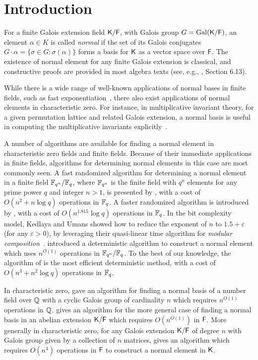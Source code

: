 \section{Introduction}

For a finite Galois extension field ${\mathsf{K}}/{\mathsf{F}}$, with Galois group $G =
\mathrm{Gal}({\mathsf{K}}/{\mathsf{F}})$, an element $\alpha \in K$ is called
\emph{normal} if the set of its Galois conjugates $G \cdot \alpha =
\{\sigma\in G: \sigma(\alpha)\}$ forms a basis for ${\mathsf{K}}$ as a vector space over
${\mathsf{F}}$. The existence of normal element for any finite Galois extension
is classical, and constructive proofs are provided in most algebra texts
(see, e.g., \cite{Lang}, Section 6.13).
 
While there is a wide range of well-known applications of normal bases in
finite fields, such as fast exponentiation~\cite{GaGaPaSh00}, there also
exist applications of normal elements in characteristic zero.  For instance,
in multiplicative invariant theory, for a given permutation lattice and
related Galois extension, a normal basis is useful in computing the
multiplicative invariants explicitly~\cite{Jam18}.

A number of algorithms are available for finding a normal element in
characteristic zero fields and finite fields.  Because of their immediate
applications in finite fields, algorithms for determining normal elements
in this case are most commonly seen.  A fast randomized algorithm for
determining a normal element in a finite field $\mathbb{F}_{q^n}/\mathbb{F}_q$, where
$\mathbb{F}_{q^n}$ is the finite field with $q^n$ elements for any prime power $q$
and integer $n>1$, is presented by , with a cost of
$O(n^2+n\log q)$ operations in $\mathbb{F}_q$.  A faster randomized algorithm is
introduced by , with a cost of $O(n^{1.815}\log q)$
operations in $\mathbb{F}_q$.  In the bit complexity model, Kedlaya and Umans showed
how to reduce the exponent of $n$ to $1.5+\varepsilon$ (for any
$\varepsilon > 0$), by leveraging their quasi-linear time algorithm for
{\em modular composition}~\cite{KeUm11}.  introduced a
deterministic algorithm to construct a normal element which uses $n^{O(1)}$
operations in $\mathbb{F}_{q^n}/\mathbb{F}_q$.  To the best of our knowledge, the
algorithm of  is the most efficient deterministic method,
with a cost of $O(n^3+n^2\log q)$ operations in $\mathbb{F}_q$.

In characteristic zero,  gave an algorithm for finding
a normal basis of a number field over $\mathbb{Q}$ with a cyclic Galois group
of cardinality $n$ which requires $n^{O(1)}$ operations in $\mathbb{Q}$.
 gives an algorithm for the more general case of finding
a normal basis in an abelian extension ${\mathsf{K}}/{\mathsf{F}}$ which requires
$O(n^{O(1)})$ in ${\mathsf{F}}$.  More generally in characteristic zero, for any
Galois extension ${\mathsf{K}}/{\mathsf{F}}$ of degree $n$ with Galois group given by a
collection of $n$ matrices,  gives an algorithm which
requires $O(n^4)$ operations in ${\mathsf{F}}$ to construct a normal element in
${\mathsf{K}}$.

